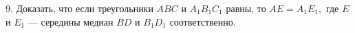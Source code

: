 9. Доказать, что если треугольники $ABC$ и $A_1B_1C_1$ равны, то $AE=A_1E_1,$ где $E$ и $E_1$ --- середины медиан $BD$ и $B_1D_1$ соответственно.\\
